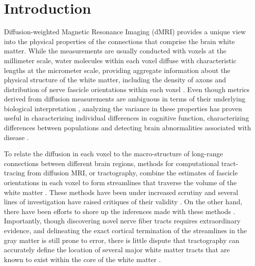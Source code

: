 \section*{Introduction}

Diffusion-weighted Magnetic Resonance Imaging (dMRI) provides a unique
view into the physical properties of the connections that comprise
the brain white matter. While the measurements are usually conducted
with voxels at the millimeter scale, water molecules within each voxel
diffuse with characteristic lengths at the micrometer scale, providing
aggregate information about the physical structure of the white matter,
including the density of axons and distribution of nerve fascicle
orientations within each voxel \cite{wandell2016clarifying}. Even though
metrics derived from diffusion measurements are ambiguous in terms
of their underlying biological interpretation \cite{Jones2013-xv},
analyzing the variance in these properties has proven useful in
characterizing individual differences in cognitive function,
characterizing differences between populations and detecting brain
abnormalities associated with disease \cite{Thomason2011-qn}.

To relate the diffusion in each voxel to the macro-structure of
long-range connections between different brain regions, methods for
computational tract-tracing from diffusion MRI, or tractography, combine
the estimates of fascicle orientations in each voxel to form streamlines
that traverse the volume of the white matter \cite{Conturo1999-je,
Mori2002-qi}. These methods have been under increased scrutiny and
several lines of investigation have raised critiques of their validity
\cite{Maier-Hein2017-vb, Thomas2014-ki}. On the other hand, there
have been efforts to shore up the inferences made with these methods
\cite{Pestilli2014NatMeth, Takemura2016-sh, Smith2013-nc, Smith2015-cx,
Smith2015-zt, Rheault2018-wk}. Importantly, though discovering novel
nerve fiber tracts requires extraordinary evidence, and delineating
the exact cortical termination of the streamlines in the gray matter
is still prone to error, there is little dispute that tractography
can accurately define the location of several major white matter
tracts that are known to exist within the core of the white matter
\cite{Maier-Hein2017-vb}.

